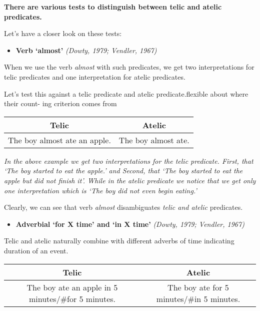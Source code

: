 \documentclass[11pt]{article}
\providecommand{\tightlist}{%
      \setlength{\itemsep}{0pt}\setlength{\parskip}{0pt}}
\begin{document}
    \textbf{There are various tests to distinguish between telic and atelic
predicates.}

Let's have a closer look on these tests:

\begin{itemize}
\tightlist
\item
  \textbf{Verb `almost'} \emph{(Dowty, 1979; Vendler, 1967)}
\end{itemize}

When we use the verb \emph{almost} with such predicates, we get two
interpretations for telic predicates and one interpretation for atelic
predicates.

Let's test this against a telic predicate and atelic predicate.flexible
about where their count- ing criterion comes from

\begin{longtable}[]{@{}cc@{}}
\toprule
Telic & Atelic\tabularnewline
\midrule
\endhead
The boy almost ate an apple. & The boy almost ate.\tabularnewline
\bottomrule
\end{longtable}

\emph{In the above example we get two interpretations for the telic
predicate. First, that `The boy started to eat the apple.' and Second,
that `The boy started to eat the apple but did not finish it'. While in
the atelic predicate we notice that we get only one interpretation which
is `The boy did not even begin eating.'}

Clearly, we can see that verb \emph{almost} disambiguates \emph{telic
and atelic} predicates.

    \begin{itemize}
\tightlist
\item
  \textbf{Adverbial `for X time' and `in X time'} \emph{(Dowty, 1979;
  Vendler, 1967)}
\end{itemize}

Telic and atelic naturally combine with different adverbs of time
indicating duration of an event.

\begin{longtable}[]{@{}cc@{}}
\toprule
\begin{minipage}[b]{0.53\columnwidth}\centering
Telic\strut
\end{minipage} & \begin{minipage}[b]{0.41\columnwidth}\centering
Atelic\strut
\end{minipage}\tabularnewline
\midrule
\endhead
\begin{minipage}[t]{0.53\columnwidth}\centering
The boy ate an apple in 5 minutes/\#for 5 minutes.\strut
\end{minipage} & \begin{minipage}[t]{0.41\columnwidth}\centering
The boy ate for 5 minutes/\#in 5 minutes.\strut
\end{minipage}\tabularnewline
\bottomrule
\end{longtable}
\end{document}
